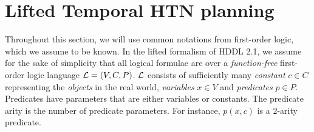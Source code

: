 \documentclass[letterpaper]{article} %
\begin{document}





\section{Lifted Temporal HTN planning}


Throughout this section, we will use common notations from first-order logic, which we assume to be known. In the lifted formalism of HDDL 2.1, we assume for the sake of simplicity that all logical formulae are over a {\it function-free} first-order logic language ${\cal{L}} = (V, C, P)$. ${\cal{L}}$ consists of sufficiently many {\it constant} $c \in C$ representing the {\it objects} in the real world, {\it variables} $x \in V$ and {\it predicates} $p \in P$. Predicates have parameters that are either variables or constants. The predicate arity is the number of predicate parameters. For instance, $p(x, c)$ is a 2-arity predicate.
\end{document}
